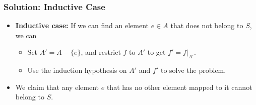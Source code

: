 \documentclass{beamer}
\begin{document}
\begin{frame}%
\frametitle{Solution: Inductive Case}

\begin{itemize}

\item<1-> \textbf{Inductive case:} If we can find an element $e \in A$ that does not belong to $S$, we can
\begin{itemize}

\item Set $A' = A - \{e\}$, and restrict $f$ to $A'$ to get $f' = f|_{A'}$.

\item Use the induction hypothesis on $A'$ and $f'$ to solve the problem.

\end{itemize}

\vspace{0.4cm}

\item<2-> We claim that any element $e$ that has no other element mapped to it cannot belong to $S$.

\end{itemize}

\begin{center}
\end{center}

\end{frame}

\end{document}
